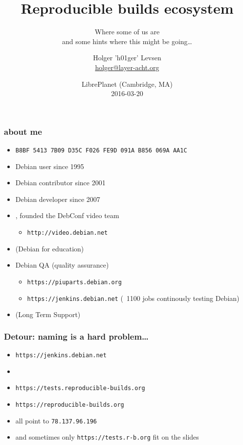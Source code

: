 \documentclass[14pt,aspectratio=169]{beamer}
\title[Reproducible builds ecosystem]{Reproducible builds ecosystem}
\subtitle{Where some of us are \\
and some hints where this might be going…}
\author[Holger 'h01ger' Levsen]{%
   \texorpdfstring{
            \centering
            Holger 'h01ger' Levsen\\
            \href{mailto:holger@layer-acht.org}{holger@layer-acht.org}
   }{h01ger}}
\institute[Debian]{}
\date[LibrePlanet]{%
 LibrePlanet (Cambridge, MA)\\
 \small{2016-03-20}}
\begin{document}
\begin{frame}[plain]
 \titlepage
\end{frame}

\begin{frame}
 \frametitle{about me}

 \begin{itemize}
  \item \small{\texttt{B8BF 5413 7B09 D35C F026  FE9D 091A B856 069A AA1C}}
  \item Debian user since 1995
  \item Debian contributor since 2001
  \item Debian developer since 2007
  \item {},
  founded the DebConf video team
   \begin{itemize}
    \item \texttt{http://video.debian.net}
   \end{itemize}
 \item {} (Debian for education)
  \item Debian QA (quality assurance)
  \begin{itemize}
   \item \texttt{https://piuparts.debian.org}
   \item \texttt{https://jenkins.debian.net} (~1100 jobs continously testing Debian)
  \end{itemize}
  \item {} (Long Term Support)
 \end{itemize}
\end{frame}

\begin{frame}
 \frametitle{Detour: naming is a hard problem…}
 \begin{itemize}
 \item \texttt{https://jenkins.debian.net}
 \item {}
 \item \texttt{https://tests.reproducible-builds.org}
 \item \texttt{https://reproducible-builds.org}
 \item<2-3> all point to \texttt{78.137.96.196}
 \item<3> \small{and sometimes only \texttt{https://tests.r-b.org} fit on the slides}
 \end{itemize}
\end{frame}
\end{document}

